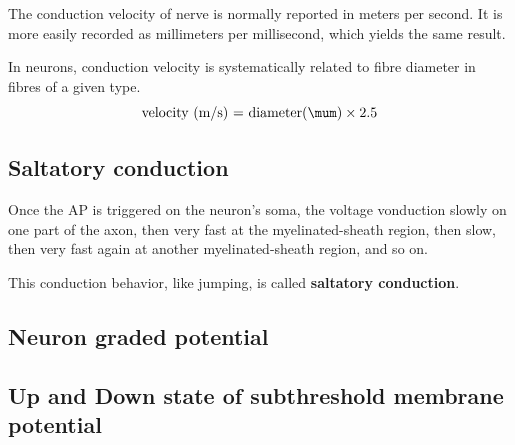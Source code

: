 The conduction velocity of nerve is normally reported in meters per second.  It
is more easily recorded as millimeters per millisecond, which yields the same
result.

In neurons, conduction velocity is systematically related to fibre diameter in
fibres of a given type.
\begin{equation}
\text{velocity (m/s) = diameter} (\mum) \times 2.5
\end{equation}

\subsection{Saltatory conduction}
\label{sec:saltatory-conduction}

Once the AP is triggered on the neuron's soma, the
voltage vonduction slowly on one part of the axon, then very fast at the
myelinated-sheath region, then slow, then very fast again at another
myelinated-sheath region, and so on. 

This conduction behavior, like jumping, is called {\bf saltatory conduction}.

\subsection{Neuron graded potential}

\subsection{Up and Down state of subthreshold membrane potential}
\label{sec:Up-state-resting-potential}
\label{sec:Down-state-resting-potential}

